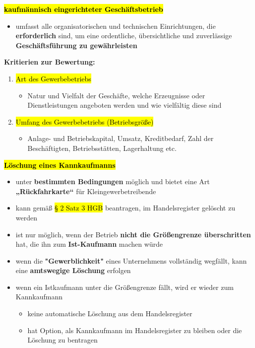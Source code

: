 \documentclass[a4paper, 10pt]{article}
\begin{document}
\noindent\textbf{\hl{kaufmännisch eingerichteter Geschäftsbetrieb}}
\begin{itemize}
    \item umfasst alle organisatorischen und technischen Einrichtungen, die \textbf{erforderlich} sind, um eine ordentliche, übersichtliche und zuverlässige \textbf{Geschäftsführung zu gewährleisten}
\end{itemize}
\textbf{Kritierien zur Bewertung:}
\begin{enumerate}
    \item \hl{Art des Gewerbebetriebs}

    \begin{itemize}
        \item Natur und Vielfalt der Geschäfte, welche Erzeugnisse oder Dienstleistungen angeboten werden und wie vielfältig diese sind
    \end{itemize}

    \item \hl{Umfang des Gewerbebetriebs (Betriebsgröße)}
    \begin{itemize}
        \item Anlage- und
Betriebskapital, Umsatz, Kreditbedarf, Zahl der
Beschäftigten, Betriebsstätten, Lagerhaltung etc.
    \end{itemize}
\end{enumerate}

\textbf{\hl{Löschung eines Kannkaufmanns}}
\begin{itemize}
    \item unter \textbf{bestimmten Bedingungen} möglich und bietet eine Art \textbf{„Rückfahrkarte“} für Kleingewerbetreibende
    \item kann gemäß \hl{§ 2 Satz 3 HGB} beantragen, im Handelsregister gelöscht zu werden
    \item ist nur möglich, wenn der Betrieb \textbf{nicht die Größengrenze überschritten} hat, die ihn zum \textbf{Ist-Kaufmann} machen würde
    \item wenn die \textbf{"Gewerblichkeit"} eines Unternehmens vollständig wegfällt, kann eine \textbf{amtswegige Löschung} erfolgen

    \item wenn ein Istkaufmann unter die Größengrenze fällt, wird er wieder zum Kannkaufmann
    \begin{itemize}
        \item keine automatische Löschung aus dem Handelsregister
        \item hat Option, als Kannkaufmann im Handelsregister zu bleiben oder die Löschung zu bentragen
    \end{itemize}
\end{itemize}
\end{document}
